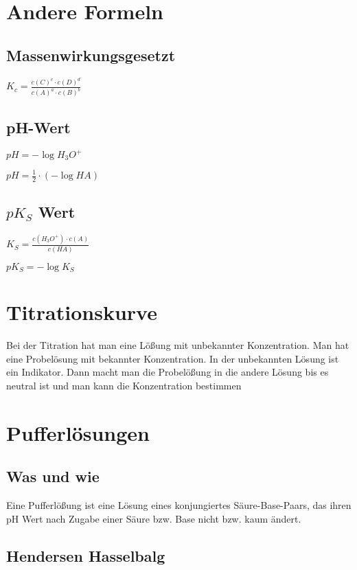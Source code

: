 \documentclass{article}
\begin{document}
\section*{Andere Formeln}

\subsection*{Massenwirkungsgesetzt}

$K_c = \frac{c(C)^c \cdot c(D)^d} {c(A)^a \cdot c(B)^b}$

\subsection*{pH-Wert}

$pH = -\log{H_3O^+}$

$pH = \frac{1}{2} \cdot (-\log{HA})$

\subsection*{$pK_S$ Wert}

$K_S = \frac {c(H_3O^+) \cdot c(A)} {c(HA)}$

$pK_S = -\log{K_S}$

\section*{Titrationskurve}

Bei der Titration hat man eine Lößung mit unbekannter Konzentration. Man hat eine Probelösung mit bekannter Konzentration. In der unbekannten Lösung ist ein Indikator. Dann macht man die Probelößung in die andere Lösung bis es neutral ist und man kann die Konzentration bestimmen




\section*{Pufferlösungen}

\subsection*{Was und wie}

Eine Pufferlößung ist eine Lösung eines konjungiertes Säure-Base-Paars, das ihren pH Wert nach Zugabe einer Säure bzw. Base nicht bzw. kaum ändert.

\subsection*{Hendersen Hasselbalg}
\end{document}
